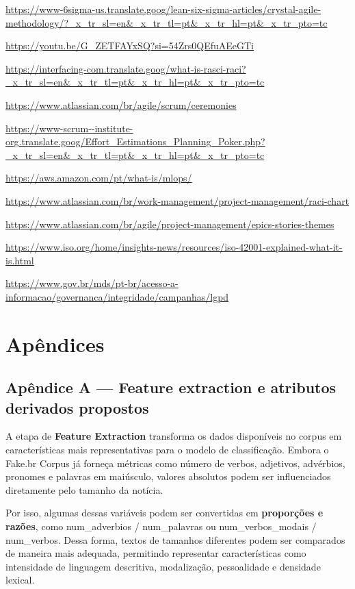\documentclass[
  brazilian,
  11pt,
]{article}
\begin{document}
\url{https://www-6sigma-us.translate.goog/lean-six-sigma-articles/crystal-agile-methodology/?_x_tr_sl=en&_x_tr_tl=pt&_x_tr_hl=pt&_x_tr_pto=tc}

\url{https://youtu.be/G_ZETFAYxSQ?si=54Zrs0QEfuAEeGTi}

\url{https://interfacing-com.translate.goog/what-is-rasci-raci?_x_tr_sl=en&_x_tr_tl=pt&_x_tr_hl=pt&_x_tr_pto=tc}

\url{https://www.atlassian.com/br/agile/scrum/ceremonies}

\url{https://www-scrum--institute-org.translate.goog/Effort_Estimations_Planning_Poker.php?_x_tr_sl=en&_x_tr_tl=pt&_x_tr_hl=pt&_x_tr_pto=tc}

\url{https://aws.amazon.com/pt/what-is/mlops/}

\url{https://www.atlassian.com/br/work-management/project-management/raci-chart}

\url{https://www.atlassian.com/br/agile/project-management/epics-stories-themes}

\url{https://www.iso.org/home/insights-news/resources/iso-42001-explained-what-it-is.html}

\url{https://www.gov.br/mds/pt-br/acesso-a-informacao/governanca/integridade/campanhas/lgpd}

\section{Apêndices}\label{apuxeandices}

\subsection{Apêndice A --- Feature extraction e atributos derivados propostos}\label{apuxeandice-a-feature-extraction-e-atributos-derivados-propostos}

A etapa de \textbf{Feature Extraction} transforma os dados disponíveis no corpus em características mais representativas para o modelo de classificação. Embora o Fake.br Corpus já forneça métricas como número de verbos, adjetivos, advérbios, pronomes e palavras em maiúsculo, valores absolutos podem ser influenciados diretamente pelo tamanho da notícia.

Por isso, algumas dessas variáveis podem ser convertidas em \textbf{proporções e razões}, como num\_adverbios / num\_palavras ou num\_verbos\_modais / num\_verbos. Dessa forma, textos de tamanhos diferentes podem ser comparados de maneira mais adequada, permitindo representar características como intensidade de linguagem descritiva, modalização, pessoalidade e densidade lexical.
\end{document}
